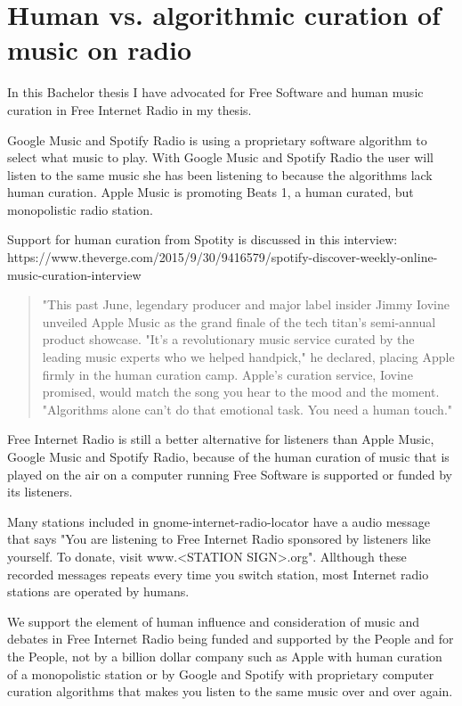 \documentclass[a4paper,norsk,utf8]{report}
\begin{document}
\part{Human vs. algorithmic curation of music on radio}

In this Bachelor thesis I have advocated for Free Software and human music curation in Free Internet Radio in my thesis.

Google Music and Spotify Radio is using a proprietary software algorithm to select what music to play.  With Google Music and Spotify Radio the user will listen to the same music she has been listening to because the algorithms lack human curation.
Apple Music is promoting Beats 1, a human curated, but monopolistic radio station.

Support for human curation from Spotity is discussed in this interview: 
https://www.theverge.com/2015/9/30/9416579/spotify-discover-weekly-online-music-curation-interview

\begin{quote}
"This past June, legendary producer and major label insider Jimmy Iovine unveiled Apple Music as the grand finale of the tech titan’s semi-annual product showcase. "It’s a revolutionary music service curated by the leading music experts who we helped handpick," he declared, placing Apple firmly in the human curation camp. Apple’s curation service, Iovine promised, would match the song you hear to the mood and the moment. "Algorithms alone can’t do that emotional task. You need a human touch."
\end{quote}

Free Internet Radio is still a better alternative for listeners than Apple Music, Google Music and Spotify Radio, because of the human curation of music that is played on the air on a computer running Free Software is supported or funded by its listeners.

Many stations included in gnome-internet-radio-locator have a audio message that says "You are listening to Free Internet Radio sponsored by listeners like yourself.  To donate, visit www.<STATION SIGN>.org".  Allthough these recorded messages repeats every time you switch station, most Internet radio stations are operated by humans.

We support the element of human influence and consideration of music and debates in Free Internet Radio being funded and supported by the People and for the People, not by a billion dollar company such as Apple with human curation of a monopolistic station or by Google and Spotify with proprietary computer curation algorithms that makes you listen to the same music over and over again.
\end{document}
